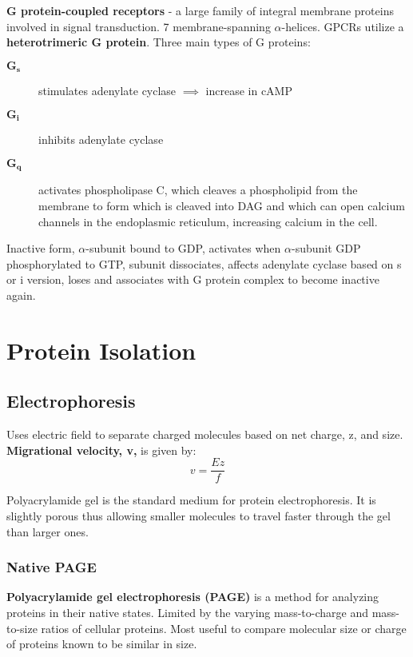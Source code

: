 \documentclass[../Bio_chemistryReview.tex]{subfiles}
\begin{document}
	\textbf{G protein-coupled receptors} - a large family of integral membrane proteins involved in signal transduction. 7 membrane-spanning $ \alpha $-helices. GPCRs utilize a \textbf{heterotrimeric G protein}. Three main types of G proteins:
	\begin{description}
		\item[$ \boldsymbol{G_{s}} $] stimulates adenylate cyclase $ \implies $ increase in cAMP
		\item[$ \boldsymbol{G_{i}} $] inhibits adenylate cyclase
		\item[$ \boldsymbol{G_{q}} $] activates phospholipase C, which cleaves a phospholipid from the membrane to form  which is cleaved into DAG and  which can open calcium channels in the endoplasmic reticulum, increasing calcium in the cell.
	\end{description}
	
	Inactive form, $ \alpha $-subunit bound to GDP, activates when $ \alpha $-subunit GDP phosphorylated to GTP, subunit dissociates, affects adenylate cyclase based on s or i version, loses  and associates with G protein complex to become inactive again.
	
	\section{Protein Isolation\supdag}
	
	\subsection{Electrophoresis\supdag}
	
	Uses electric field to separate charged molecules based on net charge, z, and size. \textbf{Migrational velocity, v,} is given by:
	\begin{equation}
	v = \dfrac{Ez}{f}
	\end{equation}
	
	Polyacrylamide gel is the standard medium for protein electrophoresis. It is slightly porous thus allowing smaller molecules to travel faster through the gel than larger ones.
	
	\subsubsection{Native PAGE\supdag}
	
	\textbf{Polyacrylamide gel electrophoresis (PAGE)} is a method for analyzing proteins in their native states. Limited by the varying mass-to-charge and mass-to-size ratios of cellular proteins. Most useful to compare molecular size or charge of proteins known to be similar in size.
	
\end{document}
